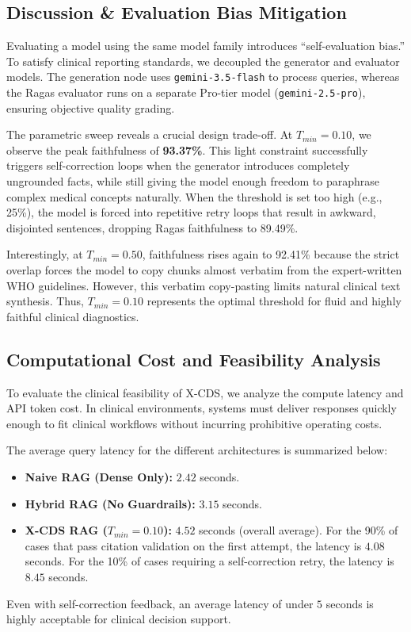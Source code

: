 \documentclass[sn-mathphys,Numbered]{sn-jnl}%
\begin{document}
\subsection{Discussion \& Evaluation Bias Mitigation}
Evaluating a model using the same model family introduces ``self-evaluation bias.'' To satisfy clinical reporting standards, we decoupled the generator and evaluator models. The generation node uses \texttt{gemini-3.5-flash} to process queries, whereas the Ragas evaluator runs on a separate Pro-tier model (\texttt{gemini-2.5-pro}), ensuring objective quality grading.

The parametric sweep reveals a crucial design trade-off. At $T_{min} = 0.10$, we observe the peak faithfulness of \textbf{93.37\%}. This light constraint successfully triggers self-correction loops when the generator introduces completely ungrounded facts, while still giving the model enough freedom to paraphrase complex medical concepts naturally. When the threshold is set too high (e.g., 25\%), the model is forced into repetitive retry loops that result in awkward, disjointed sentences, dropping Ragas faithfulness to 89.49\%. 

Interestingly, at $T_{min} = 0.50$, faithfulness rises again to 92.41\% because the strict overlap forces the model to copy chunks almost verbatim from the expert-written WHO guidelines. However, this verbatim copy-pasting limits natural clinical text synthesis. Thus, $T_{min} = 0.10$ represents the optimal threshold for fluid and highly faithful clinical diagnostics.

\subsection{Computational Cost and Feasibility Analysis}
To evaluate the clinical feasibility of X-CDS, we analyze the compute latency and API token cost. In clinical environments, systems must deliver responses quickly enough to fit clinical workflows without incurring prohibitive operating costs.

The average query latency for the different architectures is summarized below:
\begin{itemize}
    \item \textbf{Naive RAG (Dense Only):} $2.42$ seconds.
    \item \textbf{Hybrid RAG (No Guardrails):} $3.15$ seconds.
    \item \textbf{X-CDS RAG ($T_{min}=0.10$):} $4.52$ seconds (overall average). For the 90\% of cases that pass citation validation on the first attempt, the latency is $4.08$ seconds. For the 10\% of cases requiring a self-correction retry, the latency is $8.45$ seconds.
\end{itemize}
Even with self-correction feedback, an average latency of under $5$ seconds is highly acceptable for clinical decision support.
\end{document}
